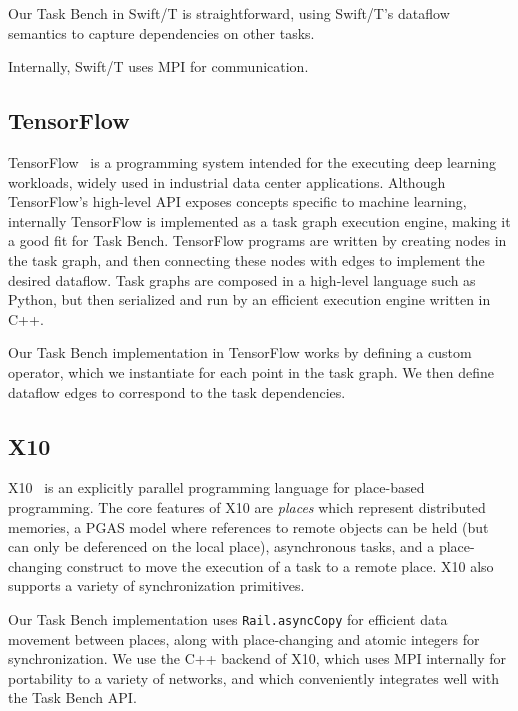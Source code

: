 Our Task Bench in Swift/T is straightforward, using Swift/T's dataflow
semantics to capture dependencies on other tasks.

Internally, Swift/T uses MPI for communication.

\subsection{TensorFlow}

TensorFlow~\cite{TensorFlow15} is a programming system intended for
the executing deep learning workloads, widely used in industrial data
center applications. Although TensorFlow's high-level API exposes
concepts specific to machine learning, internally TensorFlow is
implemented as a task graph execution engine, making it a good fit for
Task Bench. TensorFlow programs are written by creating nodes in the
task graph, and then connecting these nodes with edges to implement
the desired dataflow. Task graphs are composed in a high-level
language such as Python, but then serialized and run by an efficient
execution engine written in C++.

Our Task Bench implementation in TensorFlow works by defining a custom
operator, which we instantiate for each point in the task graph. We
then define dataflow edges to correspond to the task dependencies.

\subsection{X10}

X10~\cite{X1005} is an explicitly parallel programming language for
place-based programming. The core features of X10 are \emph{places}
which represent distributed memories, a PGAS model where references to
remote objects can be held (but can only be deferenced on the local
place), asynchronous tasks, and a place-changing construct to move the
execution of a task to a remote place. X10 also supports a variety of
synchronization primitives.

Our Task Bench implementation uses
\lstinline[language=X10]{Rail.asyncCopy} for efficient data movement
between places, along with place-changing and atomic integers for
synchronization. We use the C++ backend of X10, which uses MPI
internally for portability to a variety of networks, and which
conveniently integrates well with the Task Bench API.
